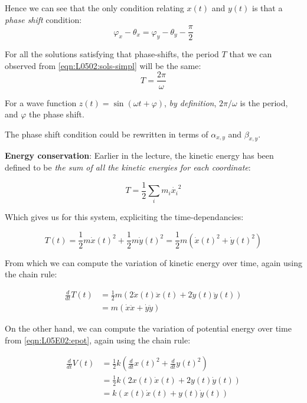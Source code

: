 \documentclass[solutions.tex]{subfiles}
\begin{document}
Hence we can see that the only condition relating $x(t)$ and $y(t)$ is that
a \textit{phase shift} condition:
\[
	\boxed{\varphi_x - \theta_x = \varphi_y -\theta_y - \dfrac{\pi}{2}}
\]

For all the solutions satisfying that phase-shifts, the period $T$ that
we can observed from \eqref{eqn:L0502:sols-simpl} will be the same:
\[
	\boxed{T=\dfrac{2\pi}{\omega}}
\]

\begin{remark} For a wave function $z(t)=\sin(\omega t+\varphi)$,
\textit{by definition}, $2\pi/\omega$ is the period, and $\varphi$
the phase shift.
\end{remark}
\begin{remark} The phase shift condition could be rewritten in terms
of $\alpha_{x,y}$ and $\beta_{x,y}$.
\end{remark}

\hr

\textbf{Energy conservation}: Earlier in the lecture, the kinetic
energy has been defined to be \textit{the sum of all the kinetic energies
for each coordinate}:

\begin{equation}
	T=\frac12\sum_i m_i \dot{x_i}^2
\end{equation}

Which gives us for this system, expliciting the time-dependancies:

\begin{equation}
	T(t)=\frac12 m \dot{x}(t)^2 + \frac12 m \dot{y}(t)^2=\frac12m(\dot{x}(t)^2+\dot{y}(t)^2)
\end{equation}

From which we can compute the variation of kinetic energy
over time, again using the chain rule:

\begin{equation}
	\label{eqn:L05E02:dkint}
	\begin{aligned}
		\frac{d}{dt}T(t) &= \frac12m(2\dot{x}(t)\ddot{x}(t)+2\dot{y}(t)\ddot{y}(t)) \\
		~ &= m(\dot{x}\ddot{x}+\dot{y}\ddot{y})
	\end{aligned}
\end{equation}

On the other hand, we can compute the variation of
potential energy over time from \eqref{eqn:L05E02:epot},
again using the chain rule:

\begin{equation}
	\label{eqn:L05E02:dpott}
	\begin{aligned}
		\frac{d}{dt}V(t) &= \frac12k(\frac{d}{dt}x(t)^2+\frac{d}{dt}y(t)^2) \\
		~ &= \frac12k(2x(t)\dot{x}(t)+2y(t)\dot{y}(t))\\
		~ &= k(x(t)\dot{x}(t)+y(t)\dot{y}(t))\\
	\end{aligned}
\end{equation}
\end{document}
